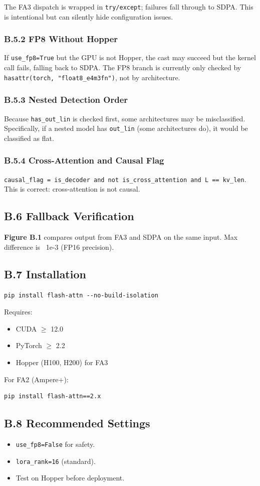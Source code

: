 The FA3 dispatch is wrapped in \texttt{try/except}; failures fall through to SDPA. 
This is intentional but can silently hide configuration issues.

\subsubsection{B.5.2 FP8 Without Hopper}

If \texttt{use\_fp8=True} but the GPU is not Hopper, the cast may succeed but the 
kernel call fails, falling back to SDPA. The FP8 branch is currently only 
checked by \texttt{hasattr(torch, "float8\_e4m3fn")}, not by architecture.

\subsubsection{B.5.3 Nested Detection Order}

Because \texttt{has\_out\_lin} is checked first, some architectures may be 
misclassified. Specifically, if a nested model has \texttt{out\_lin} (some 
architectures do), it would be classified as flat.

\subsubsection{B.5.4 Cross-Attention and Causal Flag}

\texttt{causal\_flag = is\_decoder and not is\_cross\_attention and L == kv\_len}. This 
is correct: cross-attention is not causal.

\subsection{B.6 Fallback Verification}

\textbf{Figure B.1} compares output from FA3 and SDPA on the same input. Max 
difference is ~1e-3 (FP16 precision).

\subsection{B.7 Installation}

\begin{lstlisting}
pip install flash-attn --no-build-isolation
\end{lstlisting}

Requires:
\begin{itemize}
\item CUDA $\ge$ 12.0
\item PyTorch $\ge$ 2.2
\item Hopper (H100, H200) for FA3

\end{itemize}
For FA2 (Ampere+):
\begin{lstlisting}
pip install flash-attn==2.x
\end{lstlisting}

\subsection{B.8 Recommended Settings}

\begin{itemize}
\item \texttt{use\_fp8=False} for safety.
\item \texttt{lora\_rank=16} (standard).
\item Test on Hopper before deployment.

\end{itemize}

